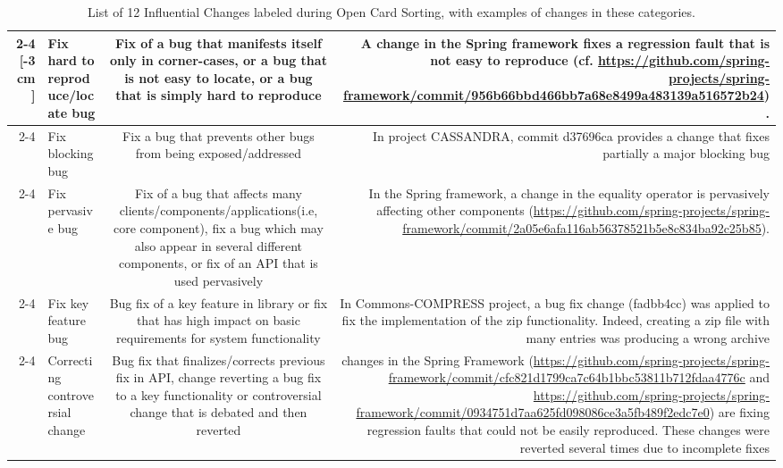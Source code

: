 \begin{table}
\scriptsize
	\begin{tabular} {r |l | c | r}
	\cline{2-4}
	\multirow{5}{*}[-3cm]{\rotatebox[origin=r]{90}{Corrective changes}} &Fix hard to reproduce/locate bug & \multicolumn{1}{p{4cm}|}{Fix of a bug that manifests itself only in corner-cases, or a bug that is not easy to locate, or a bug that is simply hard to reproduce} & \multicolumn{1}{p{5.5cm}}{A change in the Spring framework fixes a regression fault that is not easy to reproduce (cf. {\tiny \url{https://github.com/spring-projects/spring-framework/commit/956b66bbd466bb7a68e8499a483139a516572b24}}).}\\\cline{2-4}
&Fix blocking bug & \multicolumn{1}{p{4cm}|}{Fix a bug that prevents other bugs from being exposed/addressed} & \multicolumn{1}{p{5.5cm}}{In project CASSANDRA, commit d37696ca provides a change that fixes partially a major blocking bug}\\ \cline{2-4}
	&Fix pervasive bug & \multicolumn{1}{p{4cm}|}{Fix of a bug that affects many clients/components/applications(i.e, core component),  fix a bug which may also appear in several different components, or  fix of an API that is used pervasively} & \multicolumn{1}{p{5.5cm}}{In the Spring framework, a change in the equality operator is pervasively affecting other components ({\tiny \url{https://github.com/spring-projects/spring-framework/commit/2a05e6afa116ab56378521b5e8c834ba92c25b85}}).}\\ \cline{2-4}
	&Fix key feature bug & \multicolumn{1}{p{4cm}|}{Bug fix of a key feature in library or fix that has high impact on basic requirements for system functionality}& \multicolumn{1}{p{5.5cm}}{In Commons-COMPRESS project, a bug fix change (fadbb4cc) was applied to fix the implementation of the zip functionality. Indeed, creating a zip file with many entries was producing a wrong archive}\\ \cline{2-4}
	&Correcting controversial change & \multicolumn{1}{p{4cm}|}{Bug fix that finalizes/corrects previous fix in API, change reverting a bug fix to a key functionality or controversial change that is debated and then reverted} &  \multicolumn{1}{p{5.5cm}}{changes in the Spring Framework ({\tiny \url{https://github.com/spring-projects/spring-framework/commit/cfc821d1799ca7c64b1bbc53811b712fdaa4776c}} and  {\tiny \url{https://github.com/spring-projects/spring-framework/commit/0934751d7aa625fd098086ce3a5fb489f2edc7e0}}) are fixing regression faults that could not be easily reproduced. These changes were reverted several times due to incomplete fixes}\\ \hline \hline
		
	\end{tabular}
	\caption{List of 12 Influential Changes labeled during Open Card Sorting, with examples of changes in these categories.}
	\label{tab:ics}
\end{table}



